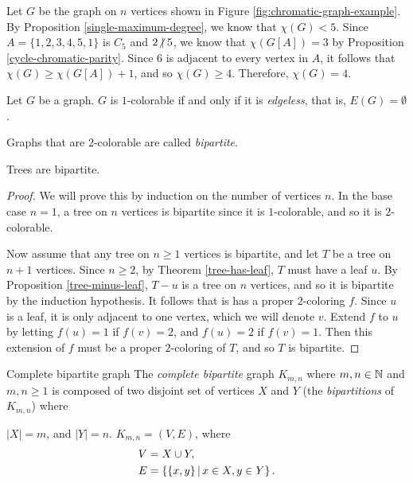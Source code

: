 \begin{exmp}
    Let $G$ be the graph on $n$ vertices shown in Figure \ref{fig:chromatic-graph-example}. By Proposition \ref{single-maximum-degree}, we know that $\chi(G) < 5$. Since $A = \{1, 2, 3, 4, 5, 1\}$ is $C_5$ and $2 \centernot\mid 5$, we know that $\chi(G[A]) = 3$ by Proposition \ref{cycle-chromatic-parity}. Since $6$ is adjacent to every vertex in $A$, it follows that $\chi(G) \geq \chi(G[A]) + 1$, and so $\chi(G) \geq 4$. Therefore, $\chi(G) = 4$.
\end{exmp}

\begin{prop}
    Let $G$ be a graph. $G$ is $1$-colorable if and only if it is \emph{edgeless}, that is, $E(G) = \emptyset$.
\end{prop}

\begin{defn}
    Graphs that are $2$-colorable are called \emph{bipartite}.
\end{defn}

\begin{prop}
    Trees are bipartite.
\end{prop}

\begin{proof}
    We will prove this by induction on the number of vertices $n$. In the base case $n=1$, a tree on $n$ vertices is bipartite since it is $1$-colorable, and so it is $2$-colorable.

    Now assume that any tree on $n \geq 1$ vertices is bipartite, and let $T$ be a tree on $n+1$ vertices. Since $n \geq 2$, by Theorem \ref{tree-has-leaf}, $T$ must have a leaf $u$. By Proposition \ref{tree-minus-leaf}, $T - u$ is a tree on $n$ vertices, and so it is bipartite by the induction hypothesis. It follows that is has a proper $2$-coloring $f$. Since $u$ is a leaf, it is only adjacent to one vertex, which we will denote $v$. Extend $f$ to $u$ by letting $f(u) = 1$ if $f(v) = 2$, and $f(u) = 2$ if $f(v) = 1$. Then this extension of $f$ must be a proper $2$-coloring of $T$, and so $T$ is bipartite.
\end{proof}

\begin{defn}Complete bipartite graph\proofbreak
    The \emph{complete bipartite} graph $K_{m,n}$ where $m,n \in \mathbb{N}$ and $m,n \geq 1$ is composed of two disjoint set of vertices $X$ and $Y$ (the \emph{bipartitions} of $K_{m,n}$) where \item $|X| = m$, and $|Y| = n$. $K_{m,n} = (V, E)$, where
    \begin{align*}
        V &= X \cup Y, \\
        E &= \left\{\{x, y\} \,\middle|\, x \in X, y \in Y \right\}.
    \end{align*}
\end{defn}

